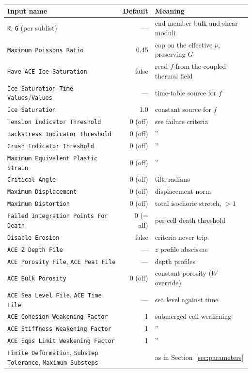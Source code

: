 \documentclass[12pt]{article}
\begin{document}
\begin{center}
\small
\begin{tabular}{lrp{6.6cm}}
\toprule
Input name & Default & Meaning \\
\midrule
\texttt{K}, \texttt{G} (per sublist) & --- &
  end-member bulk and shear moduli \\
\texttt{Maximum Poissons Ratio} & 0.45 &
  cap on the effective $\nu$, preserving $G$ \\
\midrule
\texttt{Have ACE Ice Saturation} & false &
  read $f$ from the coupled thermal field \\
\texttt{Ice Saturation Time Values}/\texttt{Values} & --- &
  time-table source for $f$ \\
\texttt{Ice Saturation} & 1.0 & constant source for $f$ \\
\midrule
\texttt{Tension Indicator Threshold}    & 0 (off) & see failure criteria \\
\texttt{Backstress Indicator Threshold} & 0 (off) & '' \\
\texttt{Crush Indicator Threshold}      & 0 (off) & '' \\
\texttt{Maximum Equivalent Plastic Strain} & 0 (off) & '' \\
\texttt{Critical Angle}                 & 0 (off) & tilt, radians \\
\texttt{Maximum Displacement}           & 0 (off) & displacement norm \\
\texttt{Maximum Distortion}             & 0 (off) &
  total isochoric stretch, $> 1$ \\
\texttt{Failed Integration Points For Death} & 0 (= all) &
  per-cell death threshold \\
\texttt{Disable Erosion} & false & criteria never trip \\
\midrule
\texttt{ACE Z Depth File} & --- & $z$ profile abscissae \\
\texttt{ACE Porosity File}, \texttt{ACE Peat File} & --- &
  depth profiles \\
\texttt{ACE Bulk Porosity} & 0 (off) & constant porosity ($W$ override) \\
\texttt{ACE Sea Level File}, \texttt{ACE Time File} & --- &
  sea level against time \\
\texttt{ACE Cohesion Weakening Factor}   & 1 & submerged-cell weakening \\
\texttt{ACE Stiffness Weakening Factor}  & 1 & '' \\
\texttt{ACE Eqps Limit Weakening Factor} & 1 & '' \\
\midrule
\texttt{Finite Deformation}, \texttt{Substep Tolerance},
\texttt{Maximum Substeps} & &
  as in Section~\ref{sec:parameters} \\
\bottomrule
\end{tabular}
\end{center}
\end{document}
